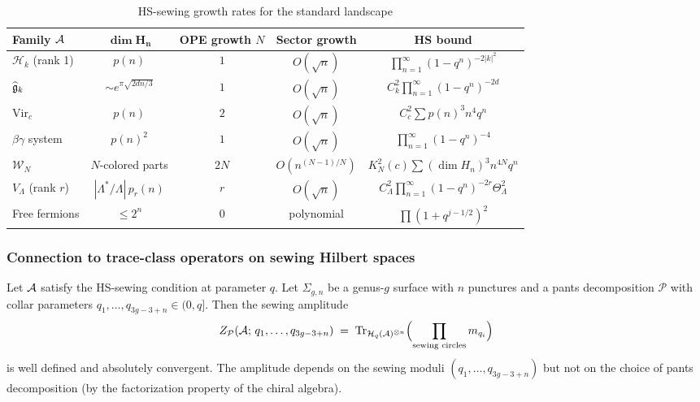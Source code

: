 \begin{table}[ht]
\centering
\caption{HS-sewing growth rates for the standard landscape}
\renewcommand{\arraystretch}{1.4}
{\footnotesize
\begin{tabular}{|l|c|c|c|c|}
\hline
\textbf{Family $\mathcal{A}$} & $\boldsymbol{\dim H_n}$ & \textbf{OPE growth $N$} & \textbf{Sector growth} & \textbf{HS bound} \\
\hline
$\mathcal{H}_k$ (rank 1) & $p(n)$ & $1$ & $O(\sqrt{n})$ & $\prod_{n=1}^\infty (1-q^n)^{-2|k|^2}$ \\
\hline
$\widehat{\mathfrak{g}}_k$ & $\sim e^{\pi\sqrt{2dn/3}}$ & $1$ & $O(\sqrt{n})$ & $C_k^2\prod_{n=1}^\infty (1-q^n)^{-2d}$ \\
\hline
$\mathrm{Vir}_c$ & $p(n)$ & $2$ & $O(\sqrt{n})$ & $C_c^2\sum p(n)^3 n^4 q^n$ \\
\hline
$\beta\gamma$ system & $p(n)^2$ & $1$ & $O(\sqrt{n})$ & $\prod_{n=1}^\infty (1-q^n)^{-4}$ \\
\hline
$\mathcal{W}_N$ & $N$-colored parts & $2N$ & $O(n^{(N-1)/N})$ & $K_N^2(c)\sum (\dim H_n)^3 n^{4N} q^n$ \\
\hline
$V_\Lambda$ (rank $r$) & $|\Lambda^*/\Lambda|\,p_r(n)$ & $r$ & $O(\sqrt{n})$ & $C_\Lambda^2\prod_{n=1}^\infty (1-q^n)^{-2r}\Theta_\Lambda^2$ \\
\hline
Free fermions & $\leq 2^n$ & $0$ & polynomial & $\prod (1+q^{j-1/2})^2$ \\
\hline
\end{tabular}}
\end{table}

\subsubsection{Connection to trace-class operators on sewing Hilbert spaces}

\begin{proposition}
Let\/ $\mathcal{A}$ satisfy the HS-sewing condition at parameter $q$. Let $\Sigma_{g,n}$ be a genus-$g$ surface with $n$ punctures and a pants decomposition $\mathcal{P}$ with collar parameters $q_1, \ldots, q_{3g-3+n} \in (0,q]$. Then the sewing amplitude
\begin{equation}%
Z_{\mathcal{P}}(\cA;\, q_1, \ldots, q_{3g-3+n}) \;=\; \Tr_{\mathcal{H}_q(\cA)^{\otimes n}} \Bigl( \prod_{\text{sewing circles}} m_{q_i} \Bigr)
\end{equation}
is well defined and absolutely convergent. The amplitude depends on the sewing moduli $(q_1, \ldots, q_{3g-3+n})$ but not on the choice of pants decomposition (by the factorization property of the chiral algebra).
\end{proposition}

